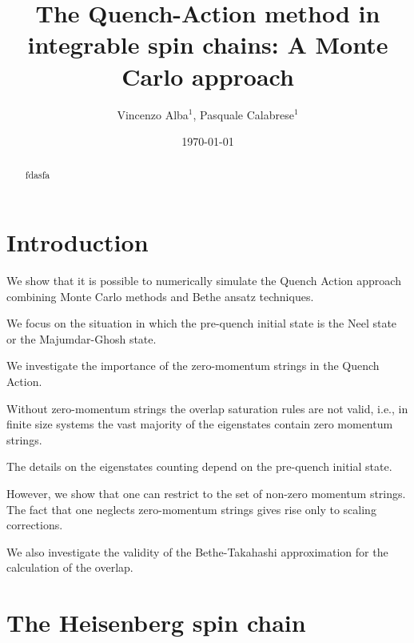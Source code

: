 \documentclass[11pt]{iopart}
\begin{document}
\setlength{\parindent}{0pt}


\title{The Quench-Action method in integrable spin chains: A Monte Carlo 
approach}

\author{Vincenzo Alba$^1$, Pasquale Calabrese$^1$}
\address{$^1$ International School for Advanced Studies (SISSA),
Via Bonomea 265, 34136, Trieste, Italy,
INFN, Sezione di Trieste}


\date{\today}



\begin{abstract} 


fdasfa
\end{abstract}

\maketitle

\section{Introduction}
\label{intro}

We show that it is possible to numerically simulate the Quench Action approach 
combining Monte Carlo methods and Bethe ansatz techniques. 

We focus on the situation in which the pre-quench initial state is the Neel 
state or the Majumdar-Ghosh state. 

We investigate the importance of the zero-momentum strings in the Quench Action. 

Without zero-momentum strings the overlap saturation rules are not valid, 
i.e., in finite size systems the vast majority of the eigenstates contain 
zero momentum strings. 

The details on the eigenstates counting depend on the pre-quench initial state. 

However, we show that one can restrict to the set of non-zero momentum strings. 
The fact that one neglects zero-momentum strings gives rise only to scaling 
corrections. 

We also investigate the validity of the Bethe-Takahashi approximation for the 
calculation of the overlap. 


\section{The Heisenberg spin chain}
\label{xxx-chain}
\end{document}
